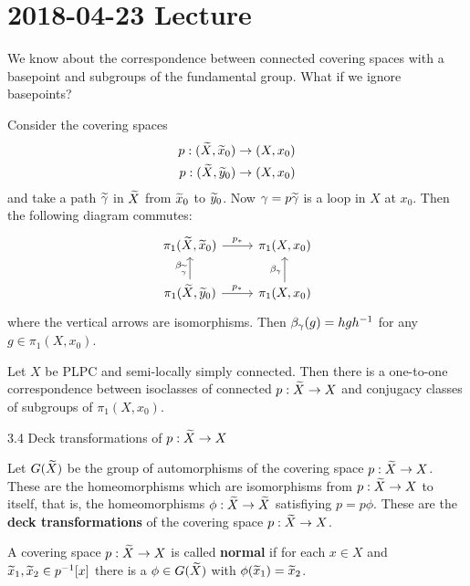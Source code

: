 \section{2018-04-23 Lecture}

We know about the correspondence between connected covering spaces with a basepoint and subgroups of the fundamental group.
What if we ignore basepoints?

\begin{rmk}
  Consider the covering spaces
  \begin{align*}
    p: (\widetilde X,\widetilde x_0) &\to (X,x_0) \\
    p: (\widetilde X,\widetilde y_0) &\to (X,x_0) 
  \end{align*}
  and take a path $\widetilde \gamma$ in $\widetilde X$ from $\widetilde x_0$ to $\widetilde y_0$.
  Now $\gamma = p\widetilde\gamma$ is a loop in $X$ at $x_0$.
  Then the following diagram commutes:
  \begin{equation*}
    \begin{tikzcd}
      \pi_1(\wt X,\wt x_0) \ar[r, "p_*"] & \pi_1(X,x_0) \\
      \pi_1(\wt X,\wt y_0) \ar[u, "\beta_{\wt\gamma}"] \ar[r, "p_*"] & \pi_1(X,x_0) \ar[u, "\beta_\gamma"]
    \end{tikzcd}
  \end{equation*}
  where the vertical arrows are isomorphisms.
  Then $\beta_\gamma(g) = hgh^{-1}$ for any $g \in \pi_1(X,x_0)$.
\end{rmk}

\begin{thm}
  Let $X$ be PLPC and semi-locally simply connected.
  Then there is a one-to-one correspondence between isoclasses of connected $p: \widetilde X \to X$ and conjugacy classes of subgroups of $\pi_1(X,x_0)$.
\end{thm}

3.4 Deck transformations of $p: \widetilde X \to X$

\begin{defn}
  Let $G(\widetilde X)$ be the group of automorphisms of the covering space $p:\widetilde X \to X$.
  These are the homeomorphisms which are isomorphisms from $p: \widetilde X \to X$ to itself, that is, the homeomorphisms $\phi: \widetilde X \to \widetilde X$ satisfiying $p=p\phi$.
  These are the \textbf{deck transformations} of the covering space $p: \widetilde X \to X$.
\end{defn}

\begin{defn}
  A covering space $p: \widetilde X \to X$ is called \textbf{normal} if for each $x \in X$ and $\widetilde x_1, \widetilde x_2 \in p^{-1}[x]$ there is a $\phi \in G(\widetilde X)$ with $\phi(\widetilde x_1)=\widetilde x_2$.
\end{defn}

